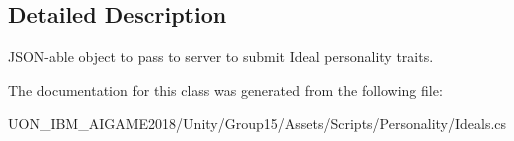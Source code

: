 \subsection{Detailed Description}
J\+S\+O\+N-\/able object to pass to server to submit Ideal personality traits. 

The documentation for this class was generated from the following file\+:\begin{DoxyCompactItemize}
\item 
U\+O\+N\+\_\+\+I\+B\+M\+\_\+\+A\+I\+G\+A\+M\+E2018/\+Unity/\+Group15/\+Assets/\+Scripts/\+Personality/Ideals.\+cs\end{DoxyCompactItemize}
